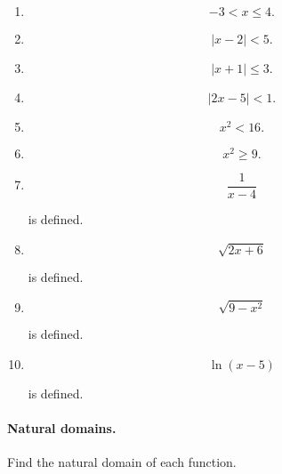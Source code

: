 \begin{enumerate}
\item

\[
-3<x\le 4.
\]

\item

\[
|x-2|<5.
\]

\item

\[
|x+1|\le 3.
\]

\item

\[
|2x-5|<1.
\]

\item

\[
x^2<16.
\]

\item

\[
x^2\ge 9.
\]

\item

\[
\frac{1}{x-4}
\]

is defined.

\item

\[
\sqrt{2x+6}
\]

is defined.

\item

\[
\sqrt{9-x^2}
\]

is defined.

\item

\[
\ln(x-5)
\]

is defined.
\end{enumerate}

\paragraph{Natural domains.}
Find the natural domain of each function.

